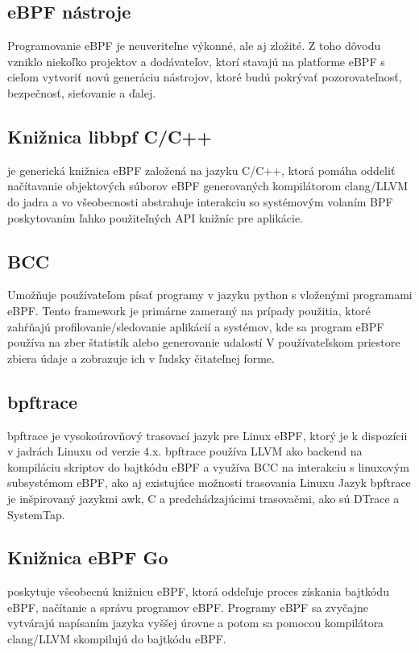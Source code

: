 \subsection{eBPF nástroje}
Programovanie eBPF je neuveriteľne výkonné, ale aj zložité. Z toho dôvodu vzniklo niekoľko projektov a dodávateľov, ktorí stavajú na platforme eBPF s cieľom vytvoriť novú generáciu nástrojov, ktoré budú pokrývať pozorovateľnosť, bezpečnosť, sieťovanie a ďalej.

\subsection*{Knižnica libbpf C/C++}
je generická knižnica eBPF založená na jazyku C/C++, ktorá pomáha oddeliť načítavanie objektových súborov eBPF generovaných kompilátorom clang/LLVM do jadra a vo všeobecnosti abstrahuje interakciu so systémovým volaním BPF poskytovaním ľahko použiteľných API knižníc pre aplikácie.

\subsection*{BCC}
Umožňuje používateľom písať programy v jazyku python s vloženými programami eBPF.  
Tento framework je primárne zameraný na prípady použitia, ktoré zahŕňajú profilovanie/sledovanie aplikácií a systémov, kde sa program eBPF používa na zber štatistík alebo generovanie udalostí
V používateľskom priestore zbiera údaje a zobrazuje ich v ľudsky čitateľnej forme. 

\subsection*{bpftrace}
bpftrace je vysokoúrovňový trasovací jazyk pre Linux eBPF, ktorý je k dispozícii v jadrách Linuxu od verzie 4.x. 
bpftrace používa LLVM ako backend na kompiláciu skriptov do bajtkódu eBPF a využíva BCC na interakciu s linuxovým subsystémom eBPF, ako aj existujúce možnosti trasovania Linuxu
Jazyk bpftrace je inšpirovaný jazykmi awk, C a predchádzajúcimi trasovačmi, ako sú DTrace a SystemTap.

\subsection*{Knižnica eBPF Go}
poskytuje všeobecnú knižnicu eBPF, ktorá oddeľuje proces získania bajtkódu eBPF, načítanie a správu programov eBPF. 
Programy eBPF sa zvyčajne vytvárajú napísaním jazyka vyššej úrovne a potom sa pomocou kompilátora clang/LLVM skompilujú do bajtkódu eBPF.

